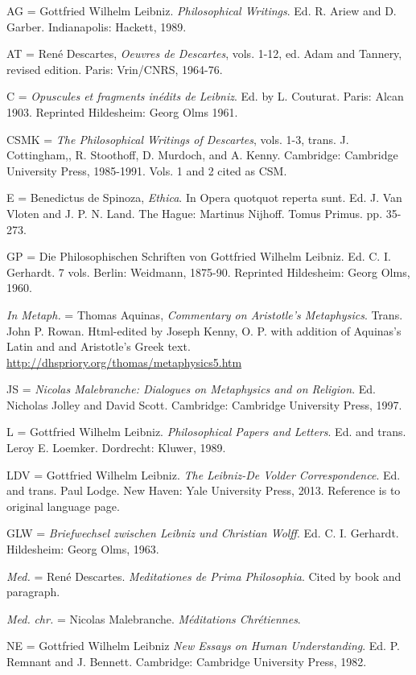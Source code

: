 AG = Gottfried Wilhelm Leibniz. \emph{Philosophical Writings}. Ed. R.
Ariew and D. Garber. Indianapolis: Hackett, 1989.

AT = René Descartes, \emph{Oeuvres de Descartes}, vols. 1-12, ed. Adam
and Tannery, revised edition. Paris: Vrin/CNRS, 1964-76.

C = \emph{Opuscules et fragments inédits de Leibniz}. Ed. by L.
Couturat. Paris: Alcan 1903. Reprinted Hildesheim: Georg Olms 1961.

CSMK = \emph{The Philosophical Writings of Descartes}, vols. 1-3, trans.
J. Cottingham,, R. Stoothoff, D. Murdoch, and A. Kenny. Cambridge:
Cambridge University Press, 1985-1991. Vols. 1 and 2 cited as CSM.

E = Benedictus de Spinoza, \emph{Ethica}. In Opera quotquot reperta
sunt. Ed. J. Van Vloten and J. P. N. Land. The Hague: Martinus Nijhoff.
Tomus Primus. pp. 35-273.

GP = Die Philosophischen Schriften von Gottfried Wilhelm Leibniz. Ed. C.
I. Gerhardt. 7 vols. Berlin: Weidmann, 1875-90. Reprinted Hildesheim:
Georg Olms, 1960.

\emph{In Metaph.} = Thomas Aquinas, \emph{Commentary on Aristotle's
	Metaphysics}. Trans. John P. Rowan. Html-edited by Joseph Kenny, O. P.
with addition of Aquinas's Latin and and Aristotle's Greek text.
\url{http://dhspriory.org/thomas/metaphysics5.htm}

JS = \emph{Nicolas Malebranche: Dialogues on Metaphysics and on
	Religion}. Ed. Nicholas Jolley and David Scott. Cambridge: Cambridge
University Press, 1997.

L = Gottfried Wilhelm Leibniz. \emph{Philosophical Papers and Letters}.
Ed. and trans. Leroy E. Loemker. Dordrecht: Kluwer, 1989.

LDV = Gottfried Wilhelm Leibniz. \emph{The Leibniz-De Volder
	Correspondence}. Ed. and trans. Paul Lodge. New Haven: Yale University
Press, 2013. Reference is to original language page.

GLW = \emph{Briefwechsel zwischen Leibniz und Christian Wolff}. Ed. C.
I. Gerhardt. Hildesheim: Georg Olms, 1963.

\emph{Med.} = René Descartes. \emph{Meditationes de Prima Philosophia}.
Cited by book and paragraph.

\emph{Med.} \emph{chr.} = Nicolas Malebranche. \emph{Méditations
	Chrétiennes}.

NE = Gottfried Wilhelm Leibniz \emph{New Essays on Human Understanding}.
Ed. P. Remnant and J. Bennett. Cambridge: Cambridge University Press,
1982.

